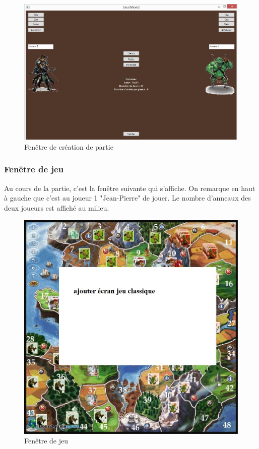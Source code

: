 \begin{figure}[ht!]
\centering
\includegraphics[scale=0.65]{img/crea.jpg}
\caption{Fenêtre de création de partie}
\end{figure}
\newpage


\subsubsection{Fenêtre de jeu}
Au cours de la partie, c'est la fenêtre suivante qui s'affiche. On remarque en haut à gauche que c'est au joueur 1 "Jean-Pierre" de jouer. Le nombre d'anneaux des deux joueurs est affiché au milieu.

\begin{figure}[ht!]
\centering
\includegraphics[scale=0.40]{img/jeu.jpg}
\caption{Fenêtre de jeu}
\end{figure}
\newpage

